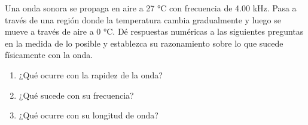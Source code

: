 \item Una onda sonora se propaga en aire a 27 °C con frecuencia de 4.00 kHz. Pasa a través de una región donde la temperatura cambia gradualmente y luego se mueve a través de aire a 0 °C. Dé respuestas numéricas a las siguientes preguntas en la medida de lo posible y establezca su razonamiento sobre lo que sucede físicamente con la onda.
\begin{enumerate}
    \item ¿Qué ocurre con la rapidez de la onda?
    \item ¿Qué sucede con su frecuencia?
    \item ¿Qué ocurre con su longitud de onda?
\end{enumerate}
